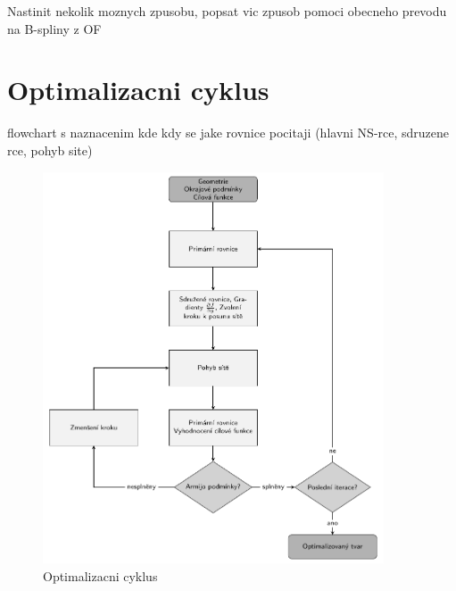 Nastinit nekolik moznych zpusobu, popsat vic zpusob pomoci obecneho prevodu na B-spliny z OF



\section{Optimalizacni cyklus}

flowchart s naznacenim kde kdy se jake rovnice pocitaji (hlavni NS-rce, sdruzene rce, pohyb site)

\begin{figure}
\includegraphics[width=0.9\textwidth]{./img/flowchart/optimalizacni_cyklus.pdf}
\caption{Optimalizacni cyklus}
\end{figure}

